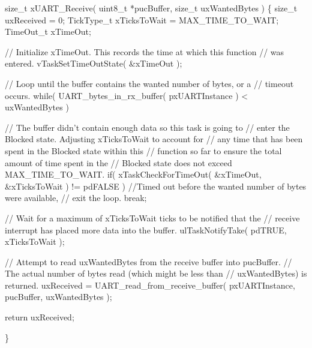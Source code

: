 \begin{DoxyPre} size\_t xUART\_Receive( uint8\_t *pucBuffer, size\_t uxWantedBytes )
 \{
 size\_t uxReceived = 0;
 TickType\_t xTicksToWait = MAX\_TIME\_TO\_WAIT;
 TimeOut\_t xTimeOut;
\begin{DoxyVerb}// Initialize xTimeOut.  This records the time at which this function
// was entered.
vTaskSetTimeOutState( &xTimeOut );

// Loop until the buffer contains the wanted number of bytes, or a
// timeout occurs.
while( UART_bytes_in_rx_buffer( pxUARTInstance ) < uxWantedBytes )
{
    // The buffer didn't contain enough data so this task is going to
    // enter the Blocked state. Adjusting xTicksToWait to account for
    // any time that has been spent in the Blocked state within this
    // function so far to ensure the total amount of time spent in the
    // Blocked state does not exceed MAX_TIME_TO_WAIT.
    if( xTaskCheckForTimeOut( &xTimeOut, &xTicksToWait ) != pdFALSE )
    {
        //Timed out before the wanted number of bytes were available,
        // exit the loop.
        break;
    }

    // Wait for a maximum of xTicksToWait ticks to be notified that the
    // receive interrupt has placed more data into the buffer.
    ulTaskNotifyTake( pdTRUE, xTicksToWait );
}

// Attempt to read uxWantedBytes from the receive buffer into pucBuffer.
// The actual number of bytes read (which might be less than
// uxWantedBytes) is returned.
uxReceived = UART_read_from_receive_buffer( pxUARTInstance,
                                            pucBuffer,
                                            uxWantedBytes );

return uxReceived;
\end{DoxyVerb}

 \}
\end{DoxyPre}
 